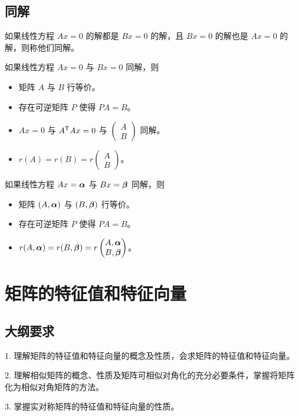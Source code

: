 \subsection{同解}

如果线性方程 $Ax=0$ 的解都是 $Bx=0$ 的解，且 $Bx=0$ 的解也是 $Ax=0$ 的解，则称他们同解。

如果线性方程 $Ax=0$ 与 $Bx=0$ 同解，则
\begin{itemize}
	\item 矩阵 $A$ 与 $B$ 行等价。
	\item 存在可逆矩阵 $P$ 使得 $PA = B$。
	\item $Ax=0$ 与 ${A}^\mathsf{T}Ax =0$ 与 $\begin{pmatrix}
		A \\ B
	\end{pmatrix}$ 同解。
	\item $r(A) = r(B) = r\begin{pmatrix}
			      A \\ B
		      \end{pmatrix}$。
\end{itemize}

如果线性方程 $Ax=\boldsymbol{\alpha}$ 与 $Bx=\boldsymbol{\beta}$ 同解，则
\begin{itemize}
	\item 矩阵 $(A,\boldsymbol{\alpha})$ 与 $(B,\boldsymbol{\beta})$ 行等价。
	\item 存在可逆矩阵 $P$ 使得 $PA = B$。
	\item $r(A,\boldsymbol{\alpha}) = r(B,\boldsymbol{\beta}) = r\begin{pmatrix}
			      A,\boldsymbol{\alpha} \\ B,\boldsymbol{\beta}
		      \end{pmatrix}$。
\end{itemize}

\section{矩阵的特征值和特征向量}

\subsection{大纲要求}

1. 理解矩阵的特征值和特征向量的概念及性质，会求矩阵的特征值和特征向量。

2. 理解相似矩阵的概念、性质及矩阵可相似对角化的充分必要条件，掌握将矩阵化为相似对角矩阵的方法。

3. 掌握实对称矩阵的特征值和特征向量的性质。

